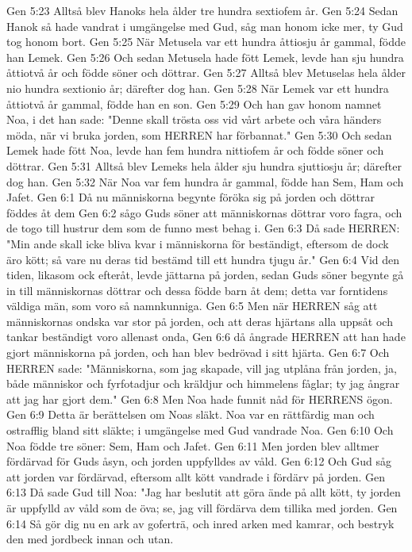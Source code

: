 Gen 5:23  Alltså blev Hanoks hela ålder tre hundra sextiofem år.
Gen 5:24  Sedan Hanok så hade vandrat i umgängelse med Gud, såg man honom icke mer, ty Gud tog honom bort.
Gen 5:25  När Metusela var ett hundra åttiosju år gammal, födde han Lemek.
Gen 5:26  Och sedan Metusela hade fött Lemek, levde han sju hundra åttiotvå år och födde söner och döttrar.
Gen 5:27  Alltså blev Metuselas hela ålder nio hundra sextionio år; därefter dog han.
Gen 5:28  När Lemek var ett hundra åttiotvå år gammal, födde han en son.
Gen 5:29  Och han gav honom namnet Noa, i det han sade: "Denne skall trösta oss vid vårt arbete och våra händers möda, när vi bruka jorden, som HERREN har förbannat."
Gen 5:30  Och sedan Lemek hade fött Noa, levde han fem hundra nittiofem år och födde söner och döttrar.
Gen 5:31  Alltså blev Lemeks hela ålder sju hundra sjuttiosju år; därefter dog han.
Gen 5:32  När Noa var fem hundra år gammal, födde han Sem, Ham och Jafet.
Gen 6:1  Då nu människorna begynte föröka sig på jorden och döttrar föddes åt dem
Gen 6:2  sågo Guds söner att människornas döttrar voro fagra, och de togo till hustrur dem som de funno mest behag i.
Gen 6:3  Då sade HERREN: "Min ande skall icke bliva kvar i människorna för beständigt, eftersom de dock äro kött; så vare nu deras tid bestämd till ett hundra tjugu år."
Gen 6:4  Vid den tiden, likasom ock efteråt, levde jättarna på jorden, sedan Guds söner begynte gå in till människornas döttrar och dessa födde barn åt dem; detta var forntidens väldiga män, som voro så namnkunniga.
Gen 6:5  Men när HERREN såg att människornas ondska var stor på jorden, och att deras hjärtans alla uppsåt och tankar beständigt voro allenast onda,
Gen 6:6  då ångrade HERREN att han hade gjort människorna på jorden, och han blev bedrövad i sitt hjärta.
Gen 6:7  Och HERREN sade: "Människorna, som jag skapade, vill jag utplåna från jorden, ja, både människor och fyrfotadjur och kräldjur och himmelens fåglar; ty jag ångrar att jag har gjort dem."
Gen 6:8  Men Noa hade funnit nåd för HERRENS ögon.
Gen 6:9  Detta är berättelsen om Noas släkt. Noa var en rättfärdig man och ostrafflig bland sitt släkte; i umgängelse med Gud vandrade Noa.
Gen 6:10  Och Noa födde tre söner: Sem, Ham och Jafet.
Gen 6:11  Men jorden blev alltmer fördärvad för Guds åsyn, och jorden uppfylldes av våld.
Gen 6:12  Och Gud såg att jorden var fördärvad, eftersom allt kött vandrade i fördärv på jorden.
Gen 6:13  Då sade Gud till Noa: "Jag har beslutit att göra ände på allt kött, ty jorden är uppfylld av våld som de öva; se, jag vill fördärva dem tillika med jorden.
Gen 6:14  Så gör dig nu en ark av goferträ, och inred arken med kamrar, och bestryk den med jordbeck innan och utan.
